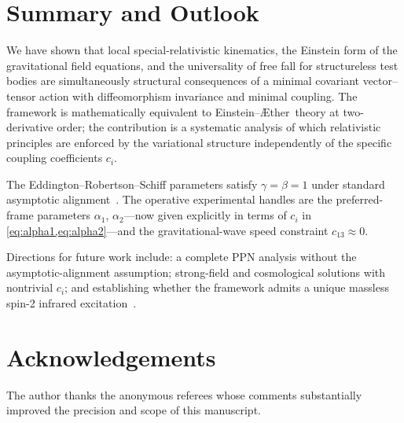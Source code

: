 \documentclass[12pt,a4paper]{article}
\newcommand{\Aether}{\AE ther}
\begin{document}
\section{Summary and Outlook}
\label{sec:summary}

We have shown that local special-relativistic kinematics, the Einstein form of
the gravitational field equations, and the universality of free fall for
structureless test bodies are simultaneously structural consequences of a
minimal covariant vector--tensor action with diffeomorphism invariance and
minimal coupling. The framework is mathematically equivalent to
Einstein--\Aether\ theory at two-derivative order; the contribution is a
systematic analysis of which relativistic principles are enforced by the
variational structure independently of the specific coupling coefficients
$c_{i}$.

The Eddington--Robertson--Schiff parameters satisfy $\gamma=\beta=1$ under
standard asymptotic alignment~\citep{foster2006}. The operative experimental
handles are the preferred-frame parameters $\alpha_{1}$, $\alpha_{2}$---now
given explicitly in terms of $c_{i}$ in \cref{eq:alpha1,eq:alpha2}---and the
gravitational-wave speed constraint $c_{13}\approx 0$.

Directions for future work include: a complete PPN analysis without the
asymptotic-alignment assumption; strong-field and cosmological solutions with
nontrivial $c_{i}$; and establishing whether the framework admits a unique
massless spin-2 infrared
excitation~\citep{weinberg1972,weinberg1965}.

\section*{Acknowledgements}
The author thanks the anonymous referees whose comments substantially improved
the precision and scope of this manuscript.

\end{document}
